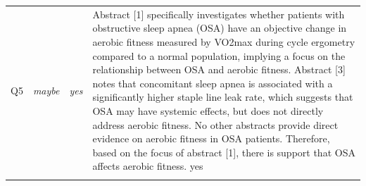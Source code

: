 \begin{longtable}{@{}c c c >{\raggedright\arraybackslash}p{8.8cm}@{}}
Q5 & \textit{maybe} & \textit{yes} & Abstract [1] specifically investigates whether patients with obstructive sleep apnea (OSA) have an objective change in aerobic fitness measured by VO2max during cycle ergometry compared to a normal population, implying a focus on the relationship between OSA and aerobic fitness. Abstract [3] notes that concomitant sleep apnea is associated with a significantly higher staple line leak rate, which suggests that OSA may have systemic effects, but does not directly address aerobic fitness. No other abstracts provide direct evidence on aerobic fitness in OSA patients. Therefore, based on the focus of abstract [1], there is support that OSA affects aerobic fitness. yes \\
\addlinespace
\bottomrule
\end{longtable}

